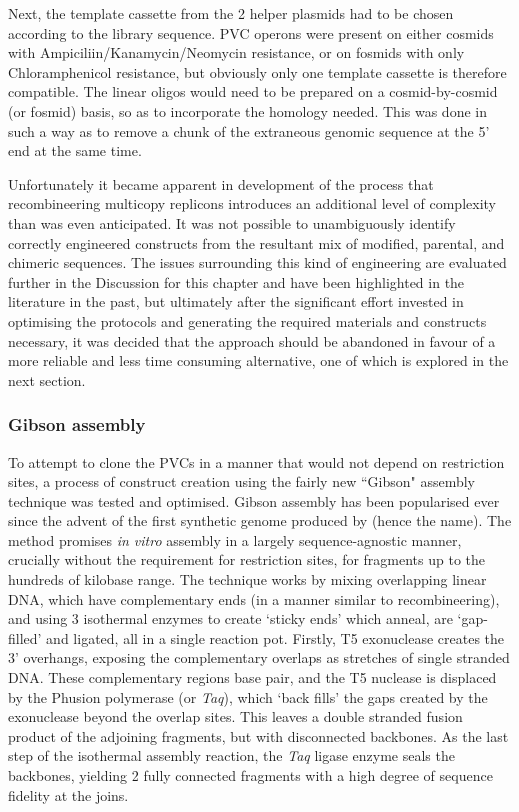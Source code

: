 Next, the template cassette from the 2 helper plasmids had to be chosen according to the library sequence. PVC operons were present on either cosmids with Ampiciliin/Kanamycin/Neomycin resistance, or on fosmids with only Chloramphenicol resistance, but obviously only one template cassette is therefore compatible. The linear oligos would need to be prepared on a cosmid-by-cosmid (or fosmid) basis, so as to incorporate the homology needed. This was done in such a way as to remove a chunk of the extraneous genomic sequence at the 5' end at the same time.

Unfortunately it became apparent in development of the process that recombineering multicopy replicons introduces an additional level of complexity than was even anticipated. It was not possible to unambiguously identify correctly engineered constructs from the resultant mix of modified, parental, and chimeric sequences. The issues surrounding this kind of engineering are evaluated further in the Discussion for this chapter and have been highlighted in the literature in the past, but ultimately after the significant effort invested in optimising the protocols and generating the required materials and constructs necessary, it was decided that the approach should be abandoned in favour of a more reliable and less time consuming alternative, one of which is explored in the next section.


\clearpage
\subsubsection{Gibson assembly}
To attempt to clone the PVCs in a manner that would not depend on restriction sites, a process of construct creation using the fairly new ``Gibson" assembly technique was tested and optimised. Gibson assembly has been popularised ever since the advent of the first synthetic genome produced by \cite{Gibson2010c, Gibson2009a} (hence the name). The method promises \emph{in vitro} assembly in a largely sequence-agnostic manner, crucially without the requirement for restriction sites, for fragments up to the hundreds of kilobase range. The technique works by mixing overlapping linear DNA, which have complementary ends (in a manner similar to recombineering), and using 3 isothermal enzymes to create `sticky ends' which anneal, are `gap-filled' and ligated, all in a single reaction pot. Firstly, T5 exonuclease creates the 3' overhangs, exposing the complementary overlaps as stretches of single stranded DNA. These complementary regions base pair, and the T5 nuclease is displaced by the Phusion polymerase (or \emph{Taq}), which `back fills' the gaps created by the exonuclease beyond the overlap sites. This leaves a double stranded fusion product of the adjoining fragments, but with disconnected backbones. As the last step of the isothermal assembly reaction, the \emph{Taq} ligase enzyme seals the backbones, yielding 2 fully connected fragments with a high degree of sequence fidelity at the joins.

